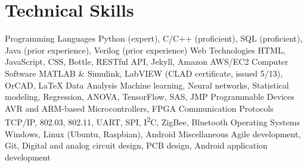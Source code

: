 \section{Technical Skills}
\begin{cvskills}
  \cvskill
    {Programming Languages}
    {Python (expert), C/C++ (proficient), SQL (proficient), Java (prior experience), Verilog (prior experience)}
  \cvskill
    {Web Technologies}
    {HTML, JavaScript, CSS, Bottle, RESTful API, Jekyll, Amazon AWS/EC2}
  \cvskill
    {Computer Software}
    {MATLAB \& Simulink, LabVIEW (CLAD certificate, issued 5/13), OrCAD, \LaTeX}
  \cvskill
    {Data Analysis}
    {Machine learning, Neural networks, Statistical modeling, Regression, ANOVA, TensorFlow, SAS, JMP}
  \cvskill
    {Programmable Devices}
    {AVR and ARM-based Microcontrollers, FPGA}
  \cvskill
    {Communication Protocols}
    {TCP/IP, 802.03, 802.11, UART, SPI, I\textsuperscript{2}C, ZigBee, Bluetooth}
  \cvskill
    {Operating Systems}
    {Windows, Linux (Ubuntu, Raspbian), Android}
  \cvskill
    {Miscellaneous}
    {Agile development, Git, Digital and analog circuit design, PCB design, Android application development}
\end{cvskills} 